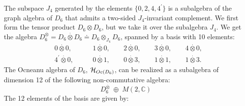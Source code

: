 \documentclass[a4paper,11pt]{article}
\def \otimesdot {\stackrel{\cdot}{\otimes}}
\begin{document}
The subspace $J_4$ generated by the elements $\{ 0, 2, 4, 4^{'} \}$
is a subalgebra of the graph algebra of $D_6$
that admits a two-sided $J_4$-invariant complement.
We first form the tensor product $D_6 \otimes D_6$, but we take it over
the subalgebra $J_4$. We get the algebra $D_6^{\otimesdot} =
D_6 \otimesdot D_6 \doteq
D_6 \otimes_{J_4} D_6$, spanned by a basis with 10 elements:
\begin{eqnarray*}
&0 \otimesdot 0,& \qquad 1 \otimesdot 0, \qquad 2 \otimesdot 0, \qquad 3
\otimesdot 0, \qquad 4 \otimesdot 0, \\
&4^{'} \otimesdot 0,& \qquad 0 \otimesdot 1,\qquad 0 \otimesdot 3,\qquad 1
\otimesdot 1,\qquad 1 \otimesdot 3.
\end{eqnarray*}
The Ocneanu algebra of $D_6$, ${\cal H}_{Oc(D_6)}$, can be realized as
a subalgebra of dimension
12 of the following non-commutative algebra:
$$
D_6^{\otimesdot} \; \oplus \; M(2,\mathbb{C})
$$
The 12 elements of the basis are given by:
\end{document}
